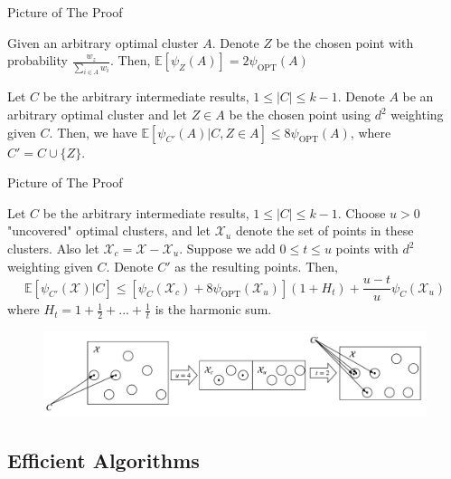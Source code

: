 \documentclass{beamer}
\newcommand{\E}{\mathbb{E}}
\begin{document}
\begin{frame}{Picture of The Proof}
	\begin{lemma}
		Given an arbitrary optimal cluster $A$. Denote $Z$ be the chosen point with probability $\frac{w_z}{\sum_{i \in A} w_i}$. Then, $\E[\psi_Z(A)] = 2 \psi_{\text{OPT}}(A)$
	\end{lemma}
	\begin{lemma}
		Let $C$ be the arbitrary intermediate results, $1 \leq |C| \leq k-1$. Denote $A$ be an arbitrary optimal cluster and let $Z \in A$ be the chosen point using $d^2$ weighting given $C$. Then, we have $\E[\psi_{C'}(A)|C,Z \in A] \leq 8 \psi_{\text{OPT}}(A)$, where $C' = C \cup \{Z\}$.
	\end{lemma}
\end{frame}

\begin{frame}{Picture of The Proof}
	\begin{lemma}
		\footnotesize
		Let $C$ be the arbitrary intermediate results, $1 \leq |C| \leq k-1$. Choose $u>0$ "uncovered" optimal clusters, and let $\mathcal{X}_u$ denote the set of points in these clusters. Also let $\mathcal{X}_c = \mathcal{X} - \mathcal{X}_u$. Suppose we add $0 \leq t \leq u$ points with $d^2$ weighting given $C$. Denote $C'$ as the resulting points. Then, 
		\begin{equation}
		\E[\psi_{C'}(\mathcal{X})|C] \leq [\psi_C(\mathcal{X}_c)+8\psi_{\text{OPT}}(\mathcal{X}_u)](1+H_t)+\frac{u-t}{u}\psi_C(\mathcal{X}_u)
		\end{equation}
		where $H_t = 1+\frac{1}{2}+...+\frac{1}{t}$ is the harmonic sum.
	\end{lemma}
	\begin{figure}
		\centering
		\includegraphics[scale=0.4]{lemma_relationships.png}
	\end{figure}
\end{frame}

\subsection{Efficient Algorithms}
\end{document}
